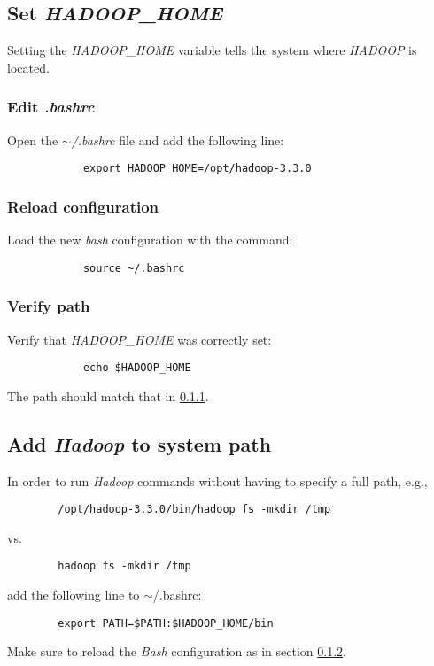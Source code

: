 \documentclass{article}
\begin{document}
    \subsection{Set \emph{HADOOP\_HOME}}
    Setting the \emph{HADOOP\_HOME} variable tells the system where \emph{HADOOP} is located.

        \subsubsection{Edit \emph{.bashrc}}
        \label{subsec:hadoophome}
        Open the \emph{$\sim$/.bashrc} file and add the following line:
        \begin{verbatim}
            export HADOOP_HOME=/opt/hadoop-3.3.0
        \end{verbatim}

        \subsubsection{Reload configuration}
        \label{subsec:reloadbash}
        Load the new \emph{bash} configuration with the command:
        \begin{verbatim}
            source ~/.bashrc
        \end{verbatim}

        \subsubsection{Verify path}
        Verify that \emph{HADOOP\_HOME} was correctly set:
        \begin{verbatim}
            echo $HADOOP_HOME
        \end{verbatim}
        The path should match that in \ref{subsec:hadoophome}.
    
    \subsection{Add \emph{Hadoop} to system path}
    In order to run \emph{Hadoop} commands without having to specify a full path, e.g.,
    \begin{verbatim}
        /opt/hadoop-3.3.0/bin/hadoop fs -mkdir /tmp
    \end{verbatim}
    vs.
    \begin{verbatim}
        hadoop fs -mkdir /tmp
    \end{verbatim}
    add the following line to $\sim$/.bashrc:
    \begin{verbatim}
        export PATH=$PATH:$HADOOP_HOME/bin
    \end{verbatim}
    Make sure to reload the \emph{Bash} configuration as in section \ref{subsec:reloadbash}.
\end{document}
